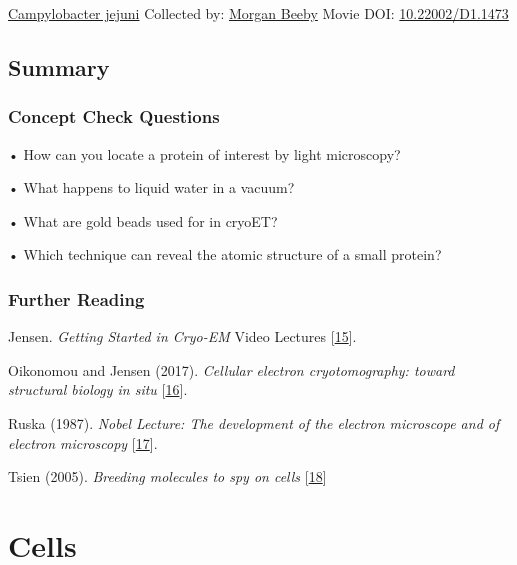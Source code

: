 \documentclass[]{tufte-book}
\begin{document}
\hypertarget{htmlwidget-dcba1ad4909332fa5b3e}{}

\label{fig:1-10a}\protect\hyperlink{tree}{Campylobacter jejuni} Collected by: \protect\hyperlink{morgan_beeby}{Morgan Beeby} Movie DOI: \href{https://doi.org/10.22002/D1.1473}{10.22002/D1.1473}

\hypertarget{summary}{%
\section{Summary}\label{summary}}

\hypertarget{concept-check-questions}{%
\subsection*{Concept Check Questions}\label{concept-check-questions}}

• How can you locate a protein of interest by light microscopy?

• What happens to liquid water in a vacuum?

• What are gold beads used for in cryoET?

• Which technique can reveal the atomic structure of a small protein?

\hypertarget{further-reading}{%
\subsection*{Further Reading}\label{further-reading}}

Jensen. \emph{Getting Started in Cryo-EM} Video Lectures {[}\protect\hyperlink{ref-jensenInternet}{15}{]}.

Oikonomou and Jensen (2017). \emph{Cellular electron cryotomography: toward structural biology in situ} {[}\protect\hyperlink{ref-oikonomou2017}{16}{]}.

Ruska (1987). \emph{Nobel Lecture: The development of the electron microscope and of electron microscopy} {[}\protect\hyperlink{ref-ruska1987}{17}{]}.

Tsien (2005). \emph{Breeding molecules to spy on cells} {[}\protect\hyperlink{ref-tsien2005}{18}{]}

\hypertarget{cells}{%
\chapter{Cells}\label{cells}}
\end{document}
